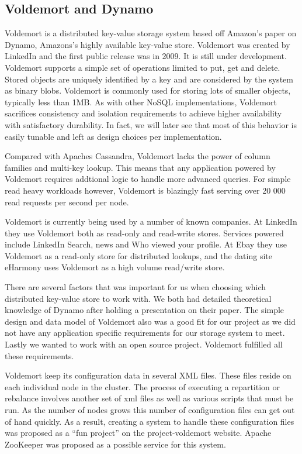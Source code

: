 \subsection{Voldemort and Dynamo}
Voldemort is a distributed key-value storage system based off Amazon's paper on Dynamo, Amazons's highly available key-value store. Voldemort was created by LinkedIn and the first public release was in 2009. It is still under development. Voldemort supports a simple set of operations limited to put, get and delete. Stored objects are uniquely identified by a key and are considered by the system as binary blobs. Voldemort is commonly used for storing lots of smaller objects, typically less than 1MB.  As with other NoSQL implementations, Voldemort sacrifices consistency and isolation requirements to achieve higher availability with satisfactory durability. In fact, we will later see that most of this behavior is easily tunable and left as design choices per implementation.

Compared with Apaches Cassandra, Voldemort lacks the power of column families and multi-key lookup. This means that any application powered by Voldemort requires addtional logic to handle more advanced queries. For simple read heavy workloads however, Voldemort is blazingly fast serving over 20 000 read requests per second per node. 

Voldemort is currently being used by a number of known companies. At LinkedIn they use Voldemort both as read-only and read-write stores. Services powered include LinkedIn Search, news and Who viewed your profile. At Ebay they use Voldemort as a read-only store for distributed lookups, and the dating site eHarmony uses Voldemort as a high volume read/write store.

There are several factors that was important for us when choosing which distributed key-value store to work with. We both had detailed theoretical knowledge of Dynamo after holding a presentation on their paper. The simple design and data model of Voldemort also was a good fit for our project as we did not have any application specific requirements for our storage system to meet. Lastly we wanted to work with an open source project. Voldemort fulfilled all these requirements. 

Voldemort keep its configuration data in several XML files. These files reside on each individual node in the cluster. The process of executing a repartition or rebalance involves another set of xml files as well as various scripts that must be run. As the number of nodes grows this number of configuration files can get out of hand quickly. 
As a result, creating a system to handle these configuration files was proposed as a ``fun project'' on the project-voldemort website. Apache ZooKeeper was proposed as a possible service for this system.  


